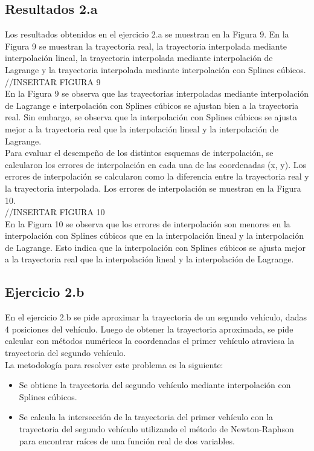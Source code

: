 \subsection{Resultados 2.a}
Los resultados obtenidos en el ejercicio 2.a se muestran en la Figura 9. En la Figura 9 se muestran la trayectoria real, la trayectoria interpolada mediante interpolación lineal, la trayectoria interpolada mediante interpolación de Lagrange y la trayectoria interpolada mediante interpolación con Splines cúbicos.\\
//INSERTAR FIGURA 9\\
En la Figura 9 se observa que las trayectorias interpoladas mediante interpolación de Lagrange e interpolación con Splines cúbicos se ajustan bien a la trayectoria real. Sin embargo, se observa que la interpolación con Splines cúbicos se ajusta mejor a la trayectoria real que la interpolación lineal y la interpolación de Lagrange.\\
Para evaluar el desempeño de los distintos esquemas de interpolación, se calcularon los errores de interpolación en cada una de las coordenadas (x, y). Los errores de interpolación se calcularon como la diferencia entre la trayectoria real y la trayectoria interpolada. Los errores de interpolación se muestran en la Figura 10.\\
//INSERTAR FIGURA 10\\
En la Figura 10 se observa que los errores de interpolación son menores en la interpolación con Splines cúbicos que en la interpolación lineal y la interpolación de Lagrange. Esto indica que la interpolación con Splines cúbicos se ajusta mejor a la trayectoria real que la interpolación lineal y la interpolación de Lagrange.\\


\subsection{Ejercicio 2.b}
En el ejercicio 2.b se pide aproximar la trayectoria de un segundo vehículo, dadas 4 posiciones del vehículo. Luego de obtener la trayectoria aproximada, se pide calcular con métodos numéricos la  coordenadas el primer vehículo atraviesa la trayectoria del segundo vehículo.\\
La metodología para resolver este problema es la siguiente:
\begin{itemize}
    \item Se obtiene la trayectoria del segundo vehículo mediante interpolación con Splines cúbicos.
    \item Se calcula la intersección de la trayectoria del primer vehículo con la trayectoria del segundo vehículo utilizando el método de Newton-Raphson para encontrar raíces de una función real de dos variables.
\end{itemize}

